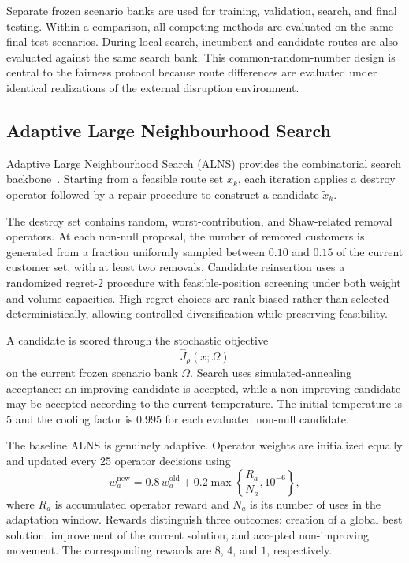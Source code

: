 \documentclass[preprint,12pt]{elsarticle}
\newcommand{\1}{\mathbf{1}}
\begin{document}
Separate frozen scenario banks are used for training, validation, search, and
final testing. Within a comparison, all competing methods are evaluated on the
same final test scenarios. During local search, incumbent and candidate routes
are also evaluated against the same search bank. This common-random-number
design is central to the fairness protocol because route differences are
evaluated under identical realizations of the external disruption environment.

\subsection{Adaptive Large Neighbourhood Search}
\label{subsec:alns}

Adaptive Large Neighbourhood Search (ALNS) provides the combinatorial search
backbone~\citep{Ropke2006ALNS}. Starting from a feasible route set $x_k$, each
iteration applies a destroy operator followed by a repair procedure to construct
a candidate $\widetilde{x}_k$.

The destroy set contains random, worst-contribution, and Shaw-related removal
operators. At each non-null proposal, the number of removed customers is
generated from a fraction uniformly sampled between $0.10$ and $0.15$ of the
current customer set, with at least two removals. Candidate reinsertion uses a
randomized regret-2 procedure with feasible-position screening under both
weight and volume capacities. High-regret choices are rank-biased rather than
selected deterministically, allowing controlled diversification while preserving
feasibility.

A candidate is scored through the stochastic objective
\[
\widehat{J}_{\rho}(x;\Omega)
\]
on the current frozen scenario bank $\Omega$. Search uses simulated-annealing
acceptance: an improving candidate is accepted, while a non-improving candidate
may be accepted according to the current temperature. The initial temperature
is $5$ and the cooling factor is $0.995$ for each evaluated non-null candidate.

The baseline ALNS is genuinely adaptive. Operator weights are initialized
equally and updated every 25 operator decisions using
\begin{equation}
	w_a^{\mathrm{new}}
	=
	0.8\,w_a^{\mathrm{old}}
	+
	0.2
	\max\left\{
	\frac{R_a}{N_a},
	10^{-6}
	\right\},
	\label{eq:alns_weight_update}
\end{equation}
where $R_a$ is accumulated operator reward and $N_a$ is its number of uses in
the adaptation window. Rewards distinguish three outcomes: creation of a global
best solution, improvement of the current solution, and accepted
non-improving movement. The corresponding rewards are $8$, $4$, and $1$,
respectively.
\end{document}
